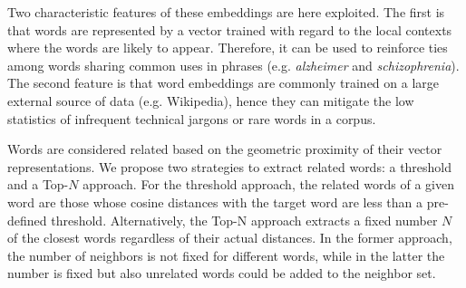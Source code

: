 \documentclass[letterpaper]{article}
\begin{document}
Two characteristic features of these embeddings are here exploited. The first is that words are represented by a vector trained with regard to the local contexts where the words are likely to appear. Therefore, it can be used to reinforce ties among words sharing common uses in phrases (e.g. \textit{alzheimer} and \textit{schizophrenia}). The second feature is that word embeddings are commonly trained on a large external source of data (e.g. Wikipedia), hence they can mitigate the low statistics of infrequent technical jargons or rare words in a corpus. 

Words are considered related based on the geometric proximity of their vector representations. We propose two strategies to extract related words: a threshold and a Top-$N$ approach. For the threshold approach, the related words of a given word are those whose cosine distances with the target word are less than a pre-defined threshold. %
Alternatively, the Top-N approach extracts a fixed number $N$ of the closest words regardless of their actual distances. 
In the former approach, the number of neighbors is not fixed for different words, while in the latter the number is fixed but also unrelated words could be added to the neighbor set. %


\end{document}
